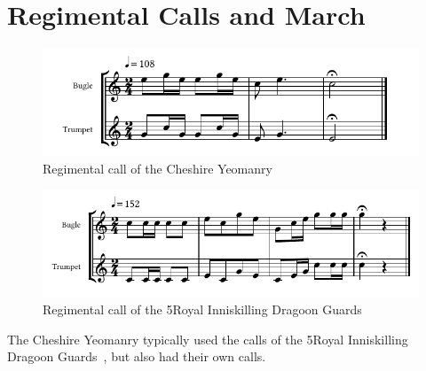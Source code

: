 \chapter{Regimental Calls and March}

\begin{figure}[h]
  \centering
  \includegraphics[width=\textwidth]{gazette/cheshire-yeomanry-call.pdf}
  \caption*{Regimental call of the Cheshire Yeomanry~\cite[p11]{trumpet-and-bugle-calls}}
\end{figure}

\vspace{10mm}

\begin{figure}[h]
  \centering
  \includegraphics[width=\textwidth]{gazette/5ridg-call.pdf}
  \caption*{Regimental call of the 5\nth Royal Inniskilling Dragoon Guards~\cite[p3]{trumpet-and-bugle-calls}}
\end{figure}

\vfill

The Cheshire Yeomanry typically used the calls of the 5\nth Royal Inniskilling Dragoon Guards~\cite[p11]{trumpet-and-bugle-calls}, but also had their own calls.

\vfill

\pagebreak

\vspace*{10mm}


\vfill

